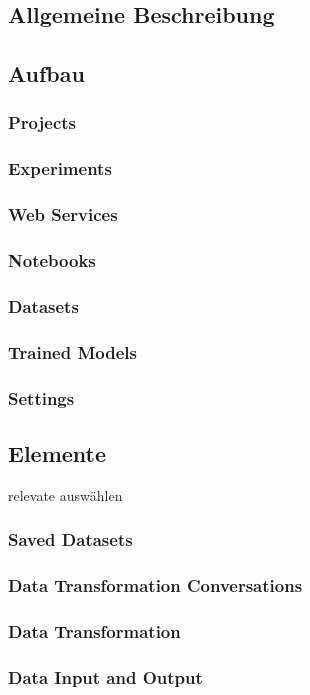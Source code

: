 \subsection{Allgemeine Beschreibung}
\subsection{Aufbau }
\subsubsection{Projects}
\subsubsection{Experiments}
\subsubsection{Web Services}
\subsubsection{Notebooks}
\subsubsection{Datasets}
\subsubsection{Trained Models}
\subsubsection{Settings}
\subsection{Elemente}
relevate auswählen
\subsubsection{Saved Datasets}
\subsubsection{Data Transformation Conversations}
\subsubsection{Data Transformation}
\subsubsection{Data Input and Output}
